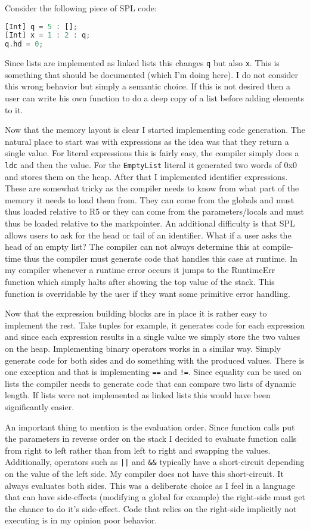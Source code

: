 \documentclass{article}
\begin{document}
Consider the following piece of SPL code:
\begin{lstlisting}[language=Rust, style=boxed]
[Int] q = 5 : [];
[Int] x = 1 : 2 : q;
q.hd = 0;
\end{lstlisting}
Since lists are implemented as linked lists this changes \texttt{q} but also \texttt{x}. This is something that should be documented (which I'm doing here). I do not consider this wrong behavior but simply a semantic choice. If this is not desired then a user can write his own function to do a deep copy of a list before adding elements to it.

Now that the memory layout is clear I started implementing code generation. The natural place to start was with expressions as the idea was that they return a single value. For literal expressions this is fairly easy, the compiler simply does a \texttt{ldc} and then the value. For the \texttt{EmptyList} literal it generated two words of 0x0 and stores them on the heap. After that I implemented identifier expressions. These are somewhat tricky as the compiler needs to know from what part of the memory it needs to load them from. They can come from the globals and must thus loaded relative to R5 or they can come from the parameters/locals and must thus be loaded relative to the markpointer. An additional difficulty is that SPL allows users to ask for the head or tail of an identifier. What if a user asks the head of an empty list? The compiler can not always determine this at compile-time thus the compiler must generate code that handles this case at runtime. In my compiler whenever a runtime error occurs it jumps to the RuntimeErr function which simply halts after showing the top value of the stack. This function is overridable by the user if they want some primitive error handling.

Now that the expression building blocks are in place it is rather easy to implement the rest. Take tuples for example, it generates code for each expression and since each expression results in a single value we simply store the two values on the heap. Implementing binary operators works in a similar way. Simply generate code for both sides and do something with the produced values. There is one exception and that is implementing \texttt{==} and \texttt{!=}. Since equality can be used on lists the compiler needs to generate code that can compare two lists of dynamic length. If lists were not implemented as linked lists this would have been significantly easier.

An important thing to mention is the evaluation order. Since function calls put the parameters in reverse order on the stack I decided to evaluate function calls from right to left rather than from left to right and swapping the values. Additionally, operators such as \texttt{||} and \texttt{\&\&} typically have a short-circuit depending on the value of the left side. My compiler does not have this short-circuit. It always evaluates both sides. This was a deliberate choice as I feel in a language that can have side-effects (modifying a global for example) the right-side must get the chance to do it's side-effect. Code that relies on the right-side implicitly not executing is in my opinion poor behavior.
\end{document}
